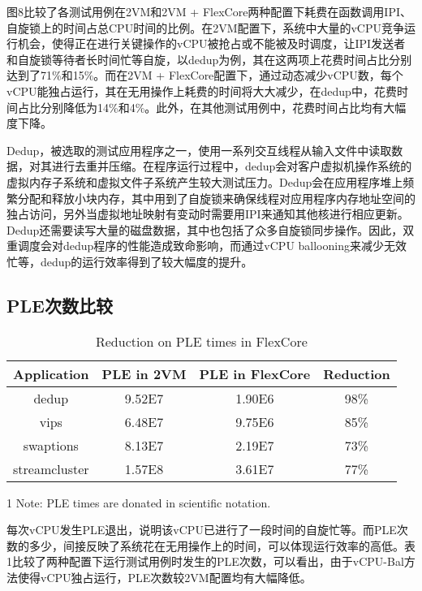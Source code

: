图8比较了各测试用例在2VM和2VM + FlexCore两种配置下耗费在函数调用IPI、自旋锁上的时间占总CPU时间的比例。在2VM配置下，系统中大量的vCPU竞争运行机会，使得正在进行关键操作的vCPU被抢占或不能被及时调度，让IPI发送者和自旋锁等待者长时间忙等自旋，以dedup为例，其在这两项上花费时间占比分别达到了71\%和15\%。而在2VM + FlexCore配置下，通过动态减少vCPU数，每个vCPU能独占运行，其在无用操作上耗费的时间将大大减少，在dedup中，花费时间占比分别降低为14\%和4\%。此外，在其他测试用例中，花费时间占比均有大幅度下降。

Dedup，被选取的测试应用程序之一，使用一系列交互线程从输入文件中读取数据，对其进行去重并压缩。在程序运行过程中，dedup会对客户虚拟机操作系统的虚拟内存子系统和虚拟文件子系统产生较大测试压力。Dedup会在应用程序堆上频繁分配和释放小块内存，其中用到了自旋锁来确保线程对应用程序内存地址空间的独占访问，另外当虚拟地址映射有变动时需要用IPI来通知其他核进行相应更新。Dedup还需要读写大量的磁盘数据，其中也包括了众多自旋锁同步操作。因此，双重调度会对dedup程序的性能造成致命影响，而通过vCPU ballooning来减少无效忙等，dedup的运行效率得到了较大幅度的提升。



\subsection{PLE次数比较}

\begin{table}[!htbp]
\caption{Reduction on PLE times in FlexCore}\label{tab:ple}
\vspace{5mm}
\centering
\begin{threeparttable}
\begin{tabular}{cccc}
\toprule
Application & PLE in 2VM & PLE in FlexCore & Reduction\\
\midrule
  dedup & 9.52E7\tnote{1} & 1.90E6 & 98\%\\
  vips & 6.48E7 & 9.75E6 & 85\%\\
  swaptions & 8.13E7 & 2.19E7 & 73\%\\
  streamcluster & 1.57E8 & 3.61E7 & 77\%\\
\bottomrule
\end{tabular}
\begin{tablenotes}
\footnotesize
\item[1] Note: PLE times are donated in scientific notation.
\end{tablenotes}
\end{threeparttable}
\end{table}

每次vCPU发生PLE退出，说明该vCPU已进行了一段时间的自旋忙等。而PLE次数的多少，间接反映了系统花在无用操作上的时间，可以体现运行效率的高低。表1比较了两种配置下运行测试用例时发生的PLE次数，可以看出，由于vCPU-Bal方法使得vCPU独占运行，PLE次数较2VM配置均有大幅降低。

